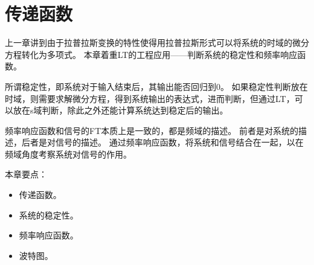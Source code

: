 \chapter{传递函数}

上一章讲到由于拉普拉斯变换的特性使得用拉普拉斯形式可以将系统的时域的微分方程转化为多项式。
本章着重LT的工程应用——判断系统的稳定性和频率响应函数。

所谓稳定性，即系统对于输入结束后，其输出能否回归到0。
如果稳定性判断放在时域，则需要求解微分方程，得到系统输出的表达式，进而判断，但通过LT，可以放在s域判断，除此之外还能计算系统达到稳定后的输出。

频率响应函数和信号的FT本质上是一致的，都是频域的描述。
前者是对系统的描述，后者是对信号的描述。
通过频率响应函数，将系统和信号结合在一起，以在频域角度考察系统对信号的作用。

本章要点：
\begin{itemize}
    \item 传递函数。
    \item 系统的稳定性。
    \item 频率响应函数。
    \item 波特图。
\end{itemize}

\newpage


\newpage


\newpage


\newpage


\newpage





